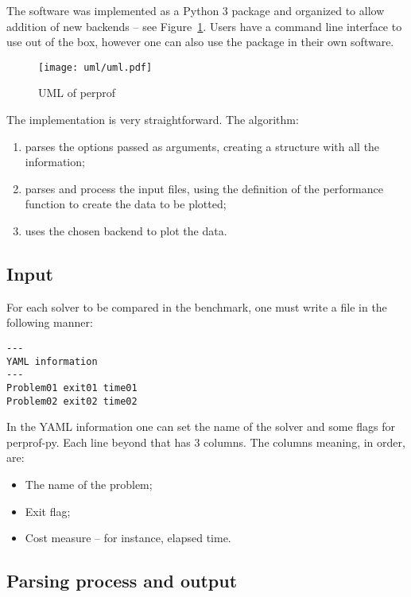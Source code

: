     The software was implemented as a Python 3 package
    and organized
    to allow addition of new backends --  see Figure~\ref{fig:uml}.
    Users have a command line interface to use out of the box,
    however one can also use the package in their own software.

    \begin{figure}[!htb]
      \centering
      \texttt{[image: uml/uml.pdf]}
      \caption{UML of perprof}
      \label{fig:uml}
    \end{figure}

    The implementation is very straightforward. The algorithm:
    \begin{enumerate}
      \item parses the options passed as arguments, creating a
        structure with all the information;
      \item parses and process the input files, using the definition
        of the performance function to create the data to be plotted;
      \item uses the chosen backend to plot the data.
    \end{enumerate}

\subsection*{Input}

    For each solver to be compared in the benchmark, one must write a file in
    the following manner:

    \begin{verbatim}
---
YAML information
---
Problem01 exit01 time01
Problem02 exit02 time02
    \end{verbatim}

    In the YAML information one can set the name of the solver and some
    flags for perprof-py.
    Each line beyond that has 3 columns. The columns meaning, in order, are:
    \begin{itemize}
      \item The name of the problem;
      \item Exit flag;
      \item Cost measure -- for instance, elapsed time.
    \end{itemize}

\subsection*{Parsing process and output}

